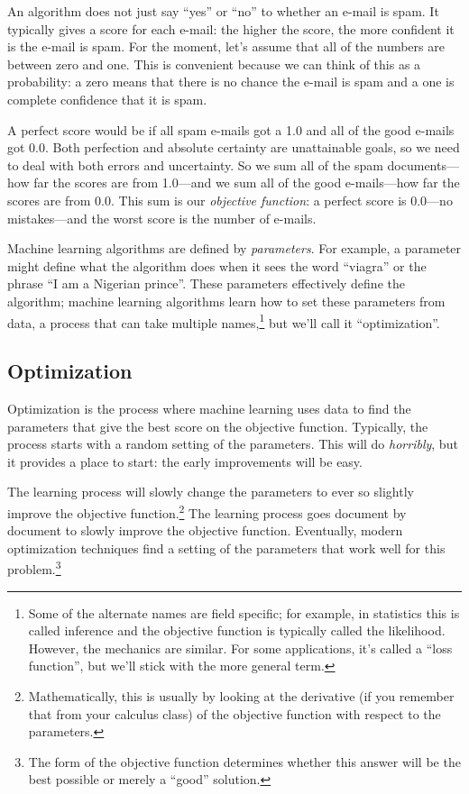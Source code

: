 An algorithm does not just say ``yes'' or ``no'' to whether an e-mail
is spam.  It typically gives a score for each e-mail: the higher the
score, the more confident it is the e-mail is spam.  For the moment,
let's assume that all of the numbers are between zero and one.  This
is convenient because we can think of this as a probability: a zero
means that there is no chance the e-mail is spam and a one is complete
confidence that it is spam.

A perfect score would be if all spam e-mails got a 1.0 and all of the
good e-mails got 0.0.  Both perfection and absolute certainty are
unattainable goals, so we need to deal with both errors and
uncertainty.  So we sum all of the spam documents---how far the scores
are from 1.0---and we sum all of the good e-mails---how far the scores
are from 0.0.  This sum is our \emph{objective function}: a perfect
score is 0.0---no mistakes---and the worst score is the number of
e-mails.

Machine learning algorithms are defined by \emph{parameters}.  For
example, a parameter might define what the algorithm does when it sees
the word ``viagra'' or the phrase ``I am a Nigerian prince''.  These
parameters effectively define the algorithm; machine learning
algorithms learn how to set these parameters from data, a process that
can take multiple names,\footnote{Some of the alternate names are
  field specific; for example, in statistics this is called inference
  and the objective function is typically called the likelihood.
  However, the mechanics are similar.  For some applications, it's
  called a ``loss function'', but we'll stick with the more general
  term.} but we'll call it ``optimization''.

\subsection{Optimization}

Optimization is the process where machine learning uses data to find
the parameters that give the best score on the objective function.
Typically, the process starts with a random setting of the parameters.
This will do \emph{horribly}, but it provides a place to start: the
early improvements will be easy.

The learning process will slowly change the parameters to ever so
slightly improve the objective function.\footnote{Mathematically, this
  is usually by looking at the derivative (if you remember that from your calculus class) of the objective function with
  respect to the parameters.}  The learning process goes document by
document to slowly improve the objective function.  Eventually, modern
optimization techniques find a setting of the parameters that work
well for this problem.\footnote{The form of the objective function
  determines whether this answer will be the best possible or merely a
  ``good'' solution.}

